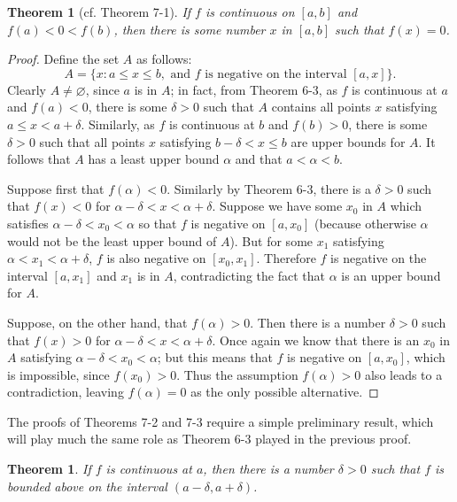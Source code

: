 \documentclass{article}
\numberwithin{corollary}{subsection}
\numberwithin{definition}{subsection}
\numberwithin{lemma}{subsection}
\newtheorem{theorem}{Theorem}
\numberwithin{theorem}{subsection}
\newtheorem*{theorem*}{Theorem}
\begin{document}
\begin{theorem*}[cf. Theorem 7-1]
  If $f$ is continuous on $[a, b]$ and $f(a) < 0 < f(b)$, then there is some
  number $x$ in $[a, b]$ such that $f(x) = 0$.
\end{theorem*}
\begin{proof}
  Define the set $A$ as follows: \[
    A = \{x : a \leq x \leq b, \text{ and } f \text{ is negative on the interval
      } [a, x]\}.
  \] Clearly $A \neq \varnothing$, since $a$ is in $A$; in fact, from Theorem
  6-3, as $f$ is continuous at $a$ and $f(a) < 0$, there is some $\delta > 0$
  such that $A$ contains all points $x$ satisfying $a \leq x < a + \delta$.
  Similarly, as $f$ is continuous at $b$ and $f(b) > 0$, there is some $\delta
  > 0$ such that all points $x$ satisfying $b - \delta < x \leq b$ are upper
  bounds for $A$. It follows that $A$ has a least upper bound $\alpha$ and that
  $a < \alpha < b$.

  Suppose first that $f(\alpha) < 0$. Similarly by Theorem 6-3, there is a
  $\delta > 0$ such that $f(x) < 0$ for $\alpha - \delta < x < \alpha +
  \delta$. Suppose we have some $x_0$ in $A$ which satisfies $\alpha - \delta <
  x_0 < \alpha$ so that $f$ is negative on $[a, x_0]$ (because otherwise
  $\alpha$ would not be the least upper bound of $A$). But for some $x_1$
  satisfying $\alpha < x_1 < \alpha + \delta$, $f$ is also negative on $[x_0,
  x_1]$. Therefore $f$ is negative on the interval $[a, x_1]$ and $x_1$ is in
  $A$, contradicting the fact that $\alpha$ is an upper bound for $A$.

  Suppose, on the other hand, that $f(\alpha) > 0$. Then there is a number
  $\delta > 0$ such that $f(x) > 0$ for $\alpha - \delta < x < \alpha + \delta$.
  Once again we know that there is an $x_0$ in $A$ satisfying $\alpha - \delta <
  x_0 < \alpha$; but this means that $f$ is negative on $[a, x_0]$, which is
  impossible, since $f(x_0) > 0$. Thus the assumption $f(\alpha) > 0$ also leads
  to a contradiction, leaving $f(\alpha) = 0$ as the only possible alternative.
\end{proof}

The proofs of Theorems 7-2 and 7-3 require a simple preliminary
result, which will play much the same role as Theorem 6-3 played in the
previous proof.

\begin{theorem}
  If $f$ is continuous at $a$, then there is a number $\delta > 0$ such that
  $f$ is bounded above on the interval $(a - \delta, a + \delta)$.
\end{theorem}
\end{document}
